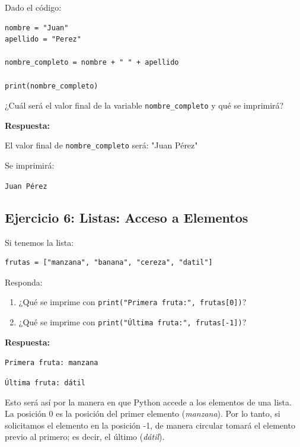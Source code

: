 \documentclass[12pt]{article}
\newcommand{\respuesta}{
    \vspace{0.3cm}
    \noindent\textbf{Respuesta:}
    \vspace{0.2cm}
}
\begin{document}
Dado el código:

\begin{lstlisting}
nombre = "Juan"
apellido = "Perez"

nombre_completo = nombre + " " + apellido

print(nombre_completo)
\end{lstlisting}

¿Cuál será el valor final de la variable \texttt{nombre\_completo} y qué se imprimirá?

\respuesta

El valor final de \texttt{nombre\_completo} será: "Juan Pérez"

Se imprimirá:

\begin{center}
\texttt{Juan Pérez}
\end{center}


\subsection*{Ejercicio 6: Listas: Acceso a Elementos}

Si tenemos la lista:

\begin{lstlisting}
frutas = ["manzana", "banana", "cereza", "datil"]
\end{lstlisting}

Responda:

\begin{enumerate}[label=\alph*)]
    \item ¿Qué se imprime con \texttt{print("Primera fruta:", frutas[0])}?
    \item ¿Qué se imprime con \texttt{print("Última fruta:", frutas[-1])}?
\end{enumerate}

\respuesta

\begin{center}
\texttt{Primera fruta: manzana}

\texttt{Última fruta: dátil}
\end{center}

Esto será así por la manera en que Python accede a los elementos de una lista. La posición 0 es la posición del primer elemento (\textit{manzana}). Por lo tanto, si solicitamos el elemento en la posición -1, de manera circular tomará el elemento previo al primero; es decir, el último (\textit{dátil}).       
\end{document}
